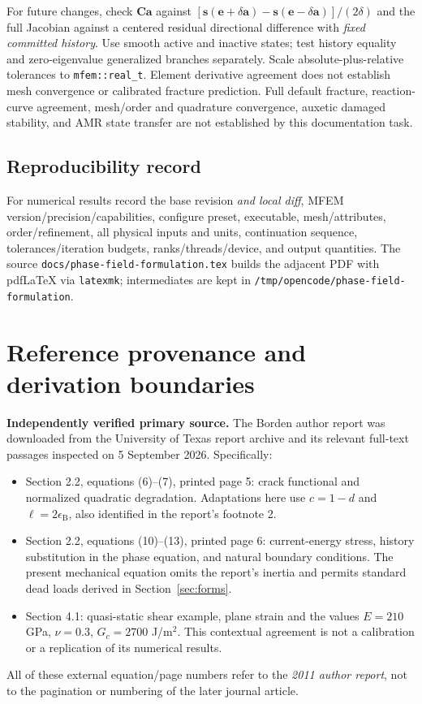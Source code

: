 \documentclass[11pt,a4paper]{article}
\newcommand{\code}[1]{\texttt{\small #1}}
\newcommand{\sectionpage}[1]{\clearpage\section{#1}}
\numberwithin{equation}{section}
\begin{document}
For future changes, check $\bm C\bm a$ against
$[\bm s(\bm e+\delta\bm a)-\bm s(\bm e-\delta\bm a)]/(2\delta)$ and
the full Jacobian against a centered residual directional difference with
\emph{fixed committed history}. Use smooth active and inactive states;
test history equality and zero-eigenvalue generalized branches separately.
Scale absolute-plus-relative tolerances to \code{mfem::real\_t}. Element
derivative agreement does not establish mesh convergence or calibrated fracture
prediction. Full default fracture, reaction-curve agreement, mesh/order and
quadrature convergence, auxetic damaged stability, and AMR state transfer are
not established by this documentation task.

\subsection{Reproducibility record}
For numerical results record the base revision \emph{and local diff}, MFEM
version/precision/capabilities, configure preset, executable, mesh/attributes,
order/refinement, all physical inputs and units, continuation sequence,
tolerances/iteration budgets, ranks/threads/device, and output quantities.
The source \code{docs/phase-field-formulation.tex} builds the adjacent PDF
with pdf\LaTeX{} via \code{latexmk}; intermediates are kept in
\nolinkurl{/tmp/opencode/phase-field-formulation}.

\sectionpage{Reference provenance and derivation boundaries}
\label{sec:references}
\textbf{Independently verified primary source.} The Borden author report
\cite{borden} was downloaded from the University of Texas report archive and
its relevant full-text passages inspected on 5 September 2026. Specifically:
\begin{itemize}
\item Section 2.2, equations (6)--(7), printed page 5: crack functional and
normalized quadratic degradation. Adaptations here use $c=1-d$ and
$\ell=2\epsilon_{\mathrm B}$, also identified in the report's footnote 2.
\item Section 2.2, equations (10)--(13), printed page 6: current-energy stress,
history substitution in the phase equation, and natural boundary conditions.
The present mechanical equation omits the report's inertia and permits
standard dead loads derived in Section~\ref{sec:forms}.
\item Section 4.1: quasi-static shear example, plane strain and the values
$E=210$ GPa, $\nu=0.3$, $G_c=2700$ J/m$^2$. This contextual agreement is not
a calibration or a replication of its numerical results.
\end{itemize}
All of these external equation/page numbers refer to the \emph{2011 author
report}, not to the pagination or numbering of the later journal article.
\end{document}
